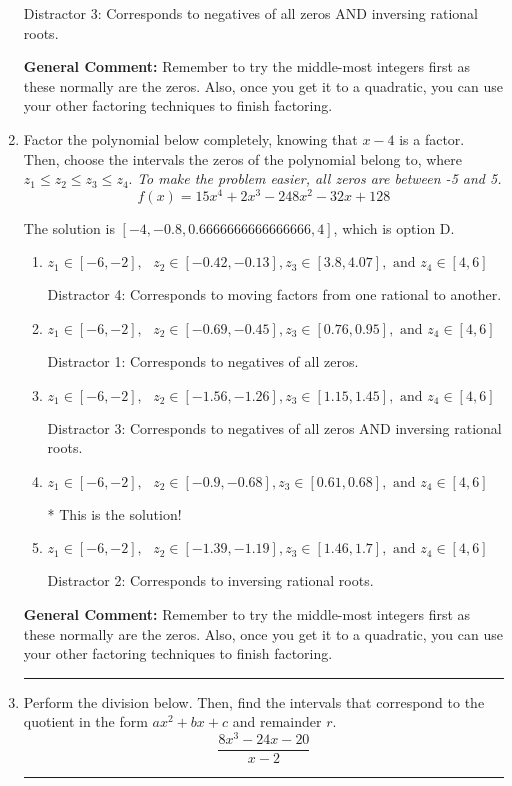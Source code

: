 \documentclass{extbook}[14pt]
\newcommand{\litem}[1]{\item #1

\rule{\textwidth}{0.4pt}}
\begin{document}
\begin{enumerate}
{\begin{enumerate}[label=\Alph*.]
 Distractor 3: Corresponds to negatives of all zeros AND inversing rational roots.
\end{enumerate}

\textbf{General Comment:} Remember to try the middle-most integers first as these normally are the zeros. Also, once you get it to a quadratic, you can use your other factoring techniques to finish factoring.
}
\litem{
Factor the polynomial below completely, knowing that $x-4$ is a factor. Then, choose the intervals the zeros of the polynomial belong to, where $z_1 \leq z_2 \leq z_3 \leq z_4$. \textit{To make the problem easier, all zeros are between -5 and 5.}
\[ f(x) = 15x^{4} +2 x^{3} -248 x^{2} -32 x + 128 \]

The solution is \( [-4, -0.8, 0.6666666666666666, 4] \), which is option D.\begin{enumerate}[label=\Alph*.]
\item \( z_1 \in [-6, -2], \text{   }  z_2 \in [-0.42, -0.13], z_3 \in [3.8, 4.07], \text{   and   } z_4 \in [4, 6] \)

 Distractor 4: Corresponds to moving factors from one rational to another.
\item \( z_1 \in [-6, -2], \text{   }  z_2 \in [-0.69, -0.45], z_3 \in [0.76, 0.95], \text{   and   } z_4 \in [4, 6] \)

 Distractor 1: Corresponds to negatives of all zeros.
\item \( z_1 \in [-6, -2], \text{   }  z_2 \in [-1.56, -1.26], z_3 \in [1.15, 1.45], \text{   and   } z_4 \in [4, 6] \)

 Distractor 3: Corresponds to negatives of all zeros AND inversing rational roots.
\item \( z_1 \in [-6, -2], \text{   }  z_2 \in [-0.9, -0.68], z_3 \in [0.61, 0.68], \text{   and   } z_4 \in [4, 6] \)

* This is the solution!
\item \( z_1 \in [-6, -2], \text{   }  z_2 \in [-1.39, -1.19], z_3 \in [1.46, 1.7], \text{   and   } z_4 \in [4, 6] \)

 Distractor 2: Corresponds to inversing rational roots.
\end{enumerate}

\textbf{General Comment:} Remember to try the middle-most integers first as these normally are the zeros. Also, once you get it to a quadratic, you can use your other factoring techniques to finish factoring.
}
\litem{
Perform the division below. Then, find the intervals that correspond to the quotient in the form $ax^2+bx+c$ and remainder $r$.
\[ \frac{8x^{3} -24 x -20}{x -2} \]

}
\end{enumerate}
\end{document}
